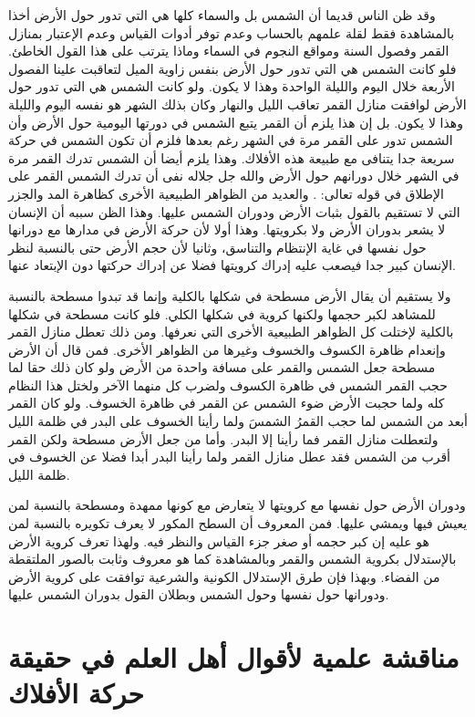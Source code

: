 وقد ظن الناس قديما أن الشمس بل والسماء كلها هي التي تدور حول الأرض أخذا بالمشاهدة فقط لقلة علمهم بالحساب وعدم توفر أدوات القياس وعدم الإعتبار بمنازل القمر وفصول السنة ومواقع النجوم في السماء وماذا يترتب على هذا القول الخاطئ. فلو كانت الشمس هي التي تدور حول الأرض بنفس زاوية الميل لتعاقبت علينا الفصول الأربعة خلال اليوم والليلة الواحدة وهذا لا يكون. ولو كانت الشمس هي التي تدور حول الأرض لوافقت منازل القمر تعاقب الليل والنهار وكان بذلك الشهر هو نفسه اليوم والليلة وهذا لا يكون. بل إن هذا يلزم أن القمر يتبع الشمس في دورتها اليومية حول الأرض وأن الشمس تدور على القمر مرة في الشهر رغم بعدها فلزم أن تكون الشمس في حركة سريعة جدا يتنافى مع طبيعة هذه الأفلاك. وهذا يلزم أيضا أن الشمس تدرك القمر مرة في الشهر خلال دورانهم حول الأرض والله جل جلاله نفى أن تدرك الشمس القمر على الإطلاق في قوله تعالى: \quranayah*[36][40]{\footnotesize (\surahname*[36])}. والعديد من الظواهر الطبيعية الأخرى كظاهرة المد والجزر التي لا تستقيم بالقول بثبات الأرض ودوران الشمس عليها. وهذا الظن سببه أن الإنسان لا يشعر بدوران الأرض ولا بكرويتها. وهذا أولا لأن حركة الأرض في مدارها مع دورانها حول نفسها في غاية الإنتظام والتناسق، وثانيا لأن حجم الأرض حتى بالنسبة لنظر الإنسان كبير جدا فيصعب عليه إدراك كرويتها فضلا عن إدراك حركتها دون الإبتعاد عنها.

ولا يستقيم أن يقال الأرض مسطحة في شكلها بالكلية وإنما قد تبدوا مسطحة بالنسبة للمشاهد لكبر حجمها ولكنها كروية في شكلها الكلي. فلو كانت مسطحة في شكلها بالكلية لإختلت كل الظواهر الطبيعية الأخرى التي نعرفها. ومن ذلك تعطل منازل القمر وإنعدام ظاهرة الكسوف والخسوف وغيرها من الظواهر الأخرى. فمن قال أن الأرض مسطحة جعل الشمس والقمر على مسافة واحدة من الأرض ولو كان ذلك حقا لما حجب القمر الشمس في ظاهرة الكسوف ولضرب كل منهما الآخر ولختل هذا النظام كله ولما حجبت الأرض ضوء الشمس عن القمر في ظاهرة الخسوف. ولو كان القمر أبعد من الشمس لما حجب القمرُ الشمسَ ولما رأينا الخسوف على البدر في ظلمة الليل ولتعطلت منازل القمر فما رأينا إلا البدر. وأما من جعل الأرض مسطحة ولكن القمر أقرب من الشمس فقد عطل منازل القمر ولما رأينا البدر أبدا فضلا عن الخسوف في ظلمة الليل. 

ودوران الأرض حول نفسها مع كرويتها لا يتعارض مع كونها ممهدة ومسطحة بالنسبة لمن يعيش فيها ويمشي عليها. فمن المعروف أن السطح المكور لا يعرف تكويره بالنسبة لمن هو عليه إن كبر حجمه أو صغر جزء القياس والنظر فيه. ولهذا تعرف كروية الأرض بالإستدلال بكروية الشمس والقمر وبالمشاهدة كما هو معروف وثابت بالصور الملتقطة من الفضاء. وبهذا فإن طرق الإستدلال الكونية والشرعية توافقت على كروية الأرض ودورانها حول نفسها وحول الشمس وبطلان القول بدوران الشمس عليها.

\section{مناقشة علمية لأقوال أهل العلم في حقيقة حركة الأفلاك}

